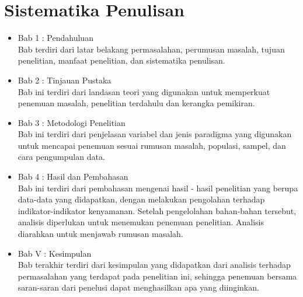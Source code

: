 \documentclass[12pt,oneside]{udthesis}
\begin{document}
\section{Sistematika Penulisan}
\lipsum[1-1]
\begin{itemize}
	\item Bab 1 : Pendahuluan\\
Bab terdiri dari latar belakang permasalahan, perumusan masalah, tujuan penelitian, manfaat penelitian, dan sistematika penulisan.
	\item Bab 2 : Tinjauan Pustaka\\
Bab ini terdiri dari landasan teori yang digunakan untuk memperkuat penemuan masalah, penelitian terdahulu dan kerangka pemikiran.
	\item Bab 3 : Metodologi Penelitian\\
Bab ini terdiri dari penjelasan variabel dan jenis paradigma yang digunakan untuk mencapai penemuan sesuai rumusan masalah, populasi, sampel, dan cara pengumpulan data.
	\item Bab 4 : Hasil dan Pembahasan\\
Bab ini terdiri dari pembahasan mengenai hasil - hasil penelitian yang berupa data-data yang didapatkan, dengan melakukan pengolahan terhadap indikator-indikator kenyamanan. Setelah pengelolahan bahan-bahan tersebut, analisis diperlukan untuk menemukan penemuan penelitian. Analisis diarahkan untuk menjawab rumusan masalah.
	\item Bab V : Kesimpulan\\
Bab terakhir terdiri dari kesimpulan yang didapatkan dari analisis terhadap permasalahan yang terdapat pada penelitian ini, sehingga penemuan bersama saran-saran dari penelusi dapat menghasilkan apa yang diinginkan.


\end{itemize}
\end{document}
